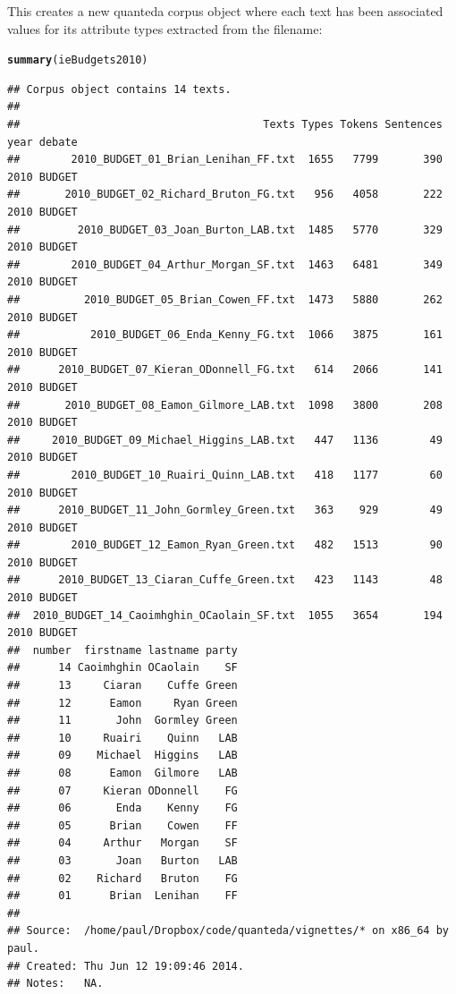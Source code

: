 \documentclass[11pt]{article}\usepackage[]{graphicx}\usepackage[]{color}
\makeatletter
\newcommand{\hlstd}[1]{\textcolor[rgb]{0.345,0.345,0.345}{#1}}%
\newcommand{\hlkwd}[1]{\textcolor[rgb]{0.737,0.353,0.396}{\textbf{#1}}}%
\newenvironment{kframe}{%
 \def\at@end@of@kframe{}%
 \ifinner\ifhmode%
  \def\at@end@of@kframe{\end{minipage}}%
  \begin{minipage}{\columnwidth}%
 \fi\fi%
 \def\FrameCommand##1{\hskip\@totalleftmargin \hskip-\fboxsep
 \colorbox{shadecolor}{##1}\hskip-\fboxsep
     \hskip-\linewidth \hskip-\@totalleftmargin \hskip\columnwidth}%
 \MakeFramed {\advance\hsize-\width
   \@totalleftmargin\z@ \linewidth\hsize
   \@setminipage}}%
 {\par\unskip\endMakeFramed%
 \at@end@of@kframe}
\newenvironment{knitrout}{}{} %
\makeatother
\begin{document}
This creates a new quanteda corpus object where each text has been associated values for its attribute types extracted from the filename:

\begin{knitrout}\footnotesize
{}\color{fgcolor}\begin{kframe}
\begin{alltt}
\hlkwd{summary}\hlstd{(ieBudgets2010)}
\end{alltt}
\begin{verbatim}
## Corpus object contains 14 texts.
## 
##                                      Texts Types Tokens Sentences year debate
##        2010_BUDGET_01_Brian_Lenihan_FF.txt  1655   7799       390 2010 BUDGET
##       2010_BUDGET_02_Richard_Bruton_FG.txt   956   4058       222 2010 BUDGET
##         2010_BUDGET_03_Joan_Burton_LAB.txt  1485   5770       329 2010 BUDGET
##        2010_BUDGET_04_Arthur_Morgan_SF.txt  1463   6481       349 2010 BUDGET
##          2010_BUDGET_05_Brian_Cowen_FF.txt  1473   5880       262 2010 BUDGET
##           2010_BUDGET_06_Enda_Kenny_FG.txt  1066   3875       161 2010 BUDGET
##      2010_BUDGET_07_Kieran_ODonnell_FG.txt   614   2066       141 2010 BUDGET
##       2010_BUDGET_08_Eamon_Gilmore_LAB.txt  1098   3800       208 2010 BUDGET
##     2010_BUDGET_09_Michael_Higgins_LAB.txt   447   1136        49 2010 BUDGET
##        2010_BUDGET_10_Ruairi_Quinn_LAB.txt   418   1177        60 2010 BUDGET
##      2010_BUDGET_11_John_Gormley_Green.txt   363    929        49 2010 BUDGET
##        2010_BUDGET_12_Eamon_Ryan_Green.txt   482   1513        90 2010 BUDGET
##      2010_BUDGET_13_Ciaran_Cuffe_Green.txt   423   1143        48 2010 BUDGET
##  2010_BUDGET_14_Caoimhghin_OCaolain_SF.txt  1055   3654       194 2010 BUDGET
##  number  firstname lastname party
##      14 Caoimhghin OCaolain    SF
##      13     Ciaran    Cuffe Green
##      12      Eamon     Ryan Green
##      11       John  Gormley Green
##      10     Ruairi    Quinn   LAB
##      09    Michael  Higgins   LAB
##      08      Eamon  Gilmore   LAB
##      07     Kieran ODonnell    FG
##      06       Enda    Kenny    FG
##      05      Brian    Cowen    FF
##      04     Arthur   Morgan    SF
##      03       Joan   Burton   LAB
##      02    Richard   Bruton    FG
##      01      Brian  Lenihan    FF
## 
## Source:  /home/paul/Dropbox/code/quanteda/vignettes/* on x86_64 by paul.
## Created: Thu Jun 12 19:09:46 2014.
## Notes:   NA.
\end{verbatim}
\end{kframe}
\end{knitrout}
\end{document}
